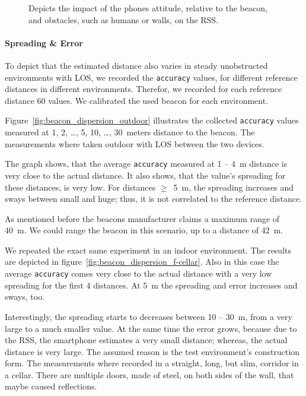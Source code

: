 \begin{figure}
	
	\caption {Depicts the impact of the phones attitude, relative to the beacon, and obstacles, such as humans or walls, on the \acs{RSS}.} %
	\label{fig:beacon_eval_situations}
\end{figure}


\paragraph{Spreading \& Error} To depict that the estimated distance also varies in steady unobstructed environments with \acs{LOS}, we recorded the \texttt{accuracy} values, for different reference distances in different environments. Therefor, we recorded for each reference distance 60 values. We calibrated the used beacon for each environment.

Figure~\ref{fig:beacon_dispersion_outdoor} illustrates the collected \texttt{accuracy} values measured at 1, 2, \ldots, 5, 10, \ldots, 30~meters distance to the beacon. The measurements where taken outdoor with \acl{LOS} between the two devices.

The graph shows, that the average \texttt{accuracy} measured at 1 -- 4~m distance is very close to the actual distance. It also shows, that the value's spreading for these distances, is very low. For distances $\geq$~5~m, the spreading increases and sways between small and huge; thus, it is not correlated to the reference distance. 

As mentioned before the beacons manufacturer claims a maximum range of 40~m. We could range the beacon in this scenario, up to a distance of 42~m.

We repeated the exact same experiment in an indoor environment. The results are depicted in figure~\ref{fig:beacon_dispersion_f-cellar}. Also in this case the average \texttt{accuracy} comes very close to the actual distance with a very low spreading for the first 4 distances. At 5~m the spreading and error increases and sways, too.

Interestingly, the spreading starts to decreases between 10 -- 30~m, from a very large to a much smaller value. At the same time the error grows, because due to the \acs{RSS}, the smartphone estimates a very small distance; whereas, the actual distance is very large. The assumed reason is the test environment's construction form. The measurements where recorded in a straight, long, but slim, corridor in a cellar. There are multiple doors, made of steel, on both sides of the wall, that maybe caused reflections.

